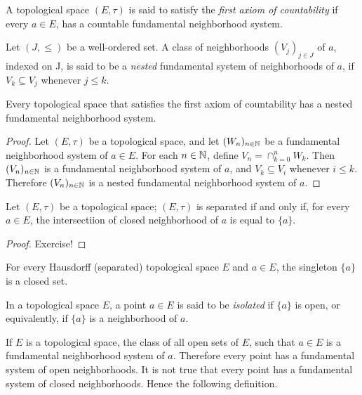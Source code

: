 \begin{definition}
	A topological space $(E, \tau)$ is said to satisfy the \emph{first axiom of countability} if every $a \in E$, has a countable fundamental neighborhood system. 
\end{definition}

\begin{definition}
	Let $(J, \leq)$ be a well-ordered set. A class of neighborhoods $(V_j)_{j \in J}$ of $a$, indexed on J, is said to be a \emph{nested} fundamental system of neighborhoods of $a$, if $V_k \subseteq V_j$ whenever $j \leq k$. 
\end{definition}

\begin{proposition}
	Every topological space that satisfies the first axiom of countability has a nested fundamental neighborhood system.
\end{proposition}
\begin{proof}
	Let $(E, \tau)$ be a topological space, and let $(W_n)_{n \in \mathbb{N}}$ be a fundamental neighborhood system of $a \in E$. For each $n \in \mathbb{N}$, define $V_n = \cap_{k=0}^n W_k$. Then $(V_n)_{n \in \mathbb{N}}$ is a fundamental neighborhood system of $a$, and $V_k \subseteq V_i$ whenever $i \leq k$. Therefore $(V_n)_{n \in \mathbb{N}}$	is a nested fundamental neighborhood system of $a$.
\end{proof}

\begin{theorem}
	Let $(E, \tau)$ be a topological space; $(E, \tau)$ is separated if and only if, for every $a \in E$, the intersectiion of closed neighborhood of $a$ is equal to $\{a\}$.
\end{theorem}
\begin{proof}
	Exercise!
\end{proof}

\begin{corollary}
	For every Hausdorff (separated) topological space $E$ and $a \in E$, the singleton $\{a\}$ is a closed set.
\end{corollary}

\begin{definition}
	In a topological space $E$, a point $a \in E$ is said to be \emph{isolated} if $\{a\}$ is open, or equivalently, if $\{a\}$ is a neighborhood of $a$.	
\end{definition}

If $E$ is a topological space, the class of all open sets of $E$, such that $a \in E$ is a fundamental neighborhood system of $a$. Therefore every point has a fundamental system of open neighborhoods. It is not true that every point has a  fundamental system of closed neighborhoods. Hence the following definition.

